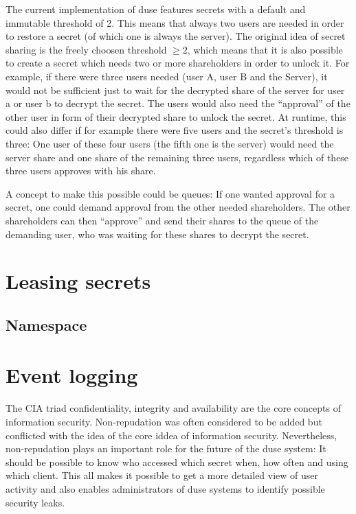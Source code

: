 The current implementation of duse features secrets with a default and 
immutable threshold of 2. This means that always two users are needed in
order to restore a secret (of which one is always the server). The original
idea of secret sharing is the freely choosen threshold $\geq 2$, which
means that it is also possible to create a secret which needs two or more
shareholders in order to unlock it. For example, if there were three users
needed (user A, user B and the Server), it would not be sufficient just to
wait for the decrypted share of the server for user a or user b to decrypt
the secret. The users would also need the ``approval'' of the other user
in form of their decrypted share to unlock the secret. At runtime, this could
also differ if for example there were five users and the secret's threshold
is three: One user of these four users (the fifth one is the server) would
need the server share and one share of the remaining three users, regardless
which of these three users approves with his share.

A concept to make this possible could be queues: If one wanted
approval for a secret, one could demand approval from the other needed
shareholders. The other shareholders can then ``approve'' and send their
shares to the queue of the demanding user, who was waiting for these shares
to decrypt the secret.

\section{Leasing secrets}

\subsection{Namespace}

\section{Event logging}

The CIA triad confidentiality, integrity and availability are the core
concepts of information security. Non-repudation was often considered
to be added but conflicted with the idea of the core iddea of information
security. Nevertheless, non-repudation plays an important role for the
future of the duse system: It should be possible to know who accessed
which secret when, how often and using which client. This all makes it
possible to get a more detailed view of user activity and also enables
administrators of duse systems to identify possible security leaks.

